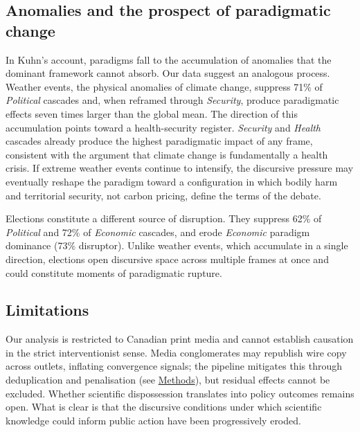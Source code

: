 \documentclass[11pt]{article}
\begin{document}
\subsection*{Anomalies and the prospect of paradigmatic change}

In Kuhn's\cite{kuhnStructureScientificRevolutions1996} account, paradigms fall to the accumulation of anomalies that the dominant framework cannot absorb. Our data suggest an analogous process. Weather events, the physical anomalies of climate change, suppress 71\% of \emph{Political} cascades and, when reframed through \emph{Security}, produce paradigmatic effects seven times larger than the global mean. The direction of this accumulation points toward a health-security register. \emph{Security} and \emph{Health} cascades already produce the highest paradigmatic impact of any frame, consistent with the argument that climate change is fundamentally a health crisis\cite{costelloManagingHealthEffects2009, romanelloLancetCountdown2023}. If extreme weather events continue to intensify, the discursive pressure may eventually reshape the paradigm toward a configuration in which bodily harm and territorial security, not carbon pricing, define the terms of the debate.

Elections constitute a different source of disruption. They suppress 62\% of \emph{Political} and 72\% of \emph{Economic} cascades, and erode \emph{Economic} paradigm dominance (73\% disruptor). Unlike weather events, which accumulate in a single direction, elections open discursive space across multiple frames at once and could constitute moments of paradigmatic rupture.

\subsection*{Limitations}

Our analysis is restricted to Canadian print media and cannot establish causation in the strict interventionist sense. Media conglomerates may republish wire copy across outlets, inflating convergence signals; the pipeline mitigates this through deduplication and penalisation (see \hyperref[sec:syndication]{Methods}), but residual effects cannot be excluded. Whether scientific dispossession translates into policy outcomes remains open. What is clear is that the discursive conditions under which scientific knowledge could inform public action have been progressively eroded.

\end{document}
